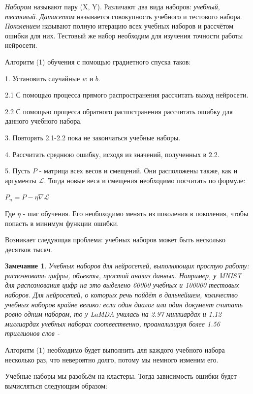 \documentclass[12pt]{extarticle}
\newtheorem*{remark}{Замечание}
\begin{document}
	\textit{Набором} называют пару (X, Y). Различают два вида наборов: \textit{учебный}, \textit{тестовый}. \textit{Датасетом} называется совокупность учебного и тестового набора. \textit{Поколением} называют полную итерацию всех учебных наборов и рассчётом ошибки для них. Тестовый же набор необходим для изучения точности работы нейросети. 
	
	Алгоритм (1) обучения с помощью градиетного спуска таков:
	
	1. Установить случайные $w$ и $b$.
	
	2.1 С помощью процесса прямого распространения рассчитать выход нейросети.
	
	2.2 С помощью процесса обратного распостранения рассчитать ошибку для данного учебного набора. 
	
	3. Повторять 2.1-2.2 пока не закончаться учебные наборы. 
	
	4. Рассчитать среднюю ошибку, исходя из значений, полученных в 2.2.
	
	5. Пусть $P$ - матрица всех весов и смещений. Они расположены также, как и аргументы $\mathcal{L}$. Тогда новые веса и смещения необходимо посчитать по формуле:
	
	\centerline{$P_n = P - \eta \nabla \mathcal{L}$}	
	
	Где $\eta$ - шаг обучения. Его необоходимо менять из поколения в поколения, чтобы попасть в минимум функции ошибки. 
	
	Возникает следующая проблема: учебных наборов может быть несколько десятков тысяч.
	
	\begin{remark}
		Учебных наборов для нейросетей, выполняющих простую работу: распозновать цифры, объекты, простой анализ данных. Например, у MNIST для распознования цифр на это выделено 60000 учебных и 100000 тестовых наборов. Для нейросетей, о которых речь пойдёт в дальнейшем, количество учебных наборов крайне велико: если один диалог или один документ считать ровно одним набором, то у LaMDA училась на 2.97 миллиардах и 1.12 миллиардах учебных наборах соотвественно, проанализируя более 1.56 триллионов слов - \cite{litlink5}
	\end{remark} 
	
	Алгоритм (1) необходимо будет выполнить для каждого учебного набора несколько раз, что невероятно долго, потому мы немного изменим его. 
	
	Учебные наборы мы разобьём на кластеры. Тогда зависимость ошибки будет вычисляться следующим образом:
	
\end{document}
